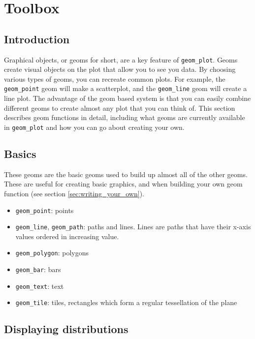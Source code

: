

\chapter{Toolbox}
\label{cha:toolbox}

\section{Introduction}\label{sec:introduction}

Graphical objects, or geoms for short, are a key feature of {\tt geom\_plot}.  Geoms create visual objects on the plot that allow you to see you data.  By choosing various types of geoms, you can recreate common plots.  For example, the {\tt geom\_point} geom will make a scatterplot, and the {\tt geom\_line} geom will create a line plot.  The advantage of the geom based system is that you can easily combine different geoms to create almost any plot that you can think of.  This section describes geom functions in detail, including what geoms are currently available in {\tt geom\_plot} and how you can go about creating your own.


\section{Basics}\label{sub:basics}

These geoms are the basic geoms used to build up almost all of the other geoms.  These are useful for creating basic graphics, and when building your own geom function (see section \ref{sec:writing_your_own}).

\begin{itemize}
  \item {\tt geom\_point}: points
  \item {\tt geom\_line}, {\tt geom\_path}: paths and lines.  Lines are paths that have their x-axis values ordered in increasing value.
  \item {\tt geom\_polygon}: polygons
  \item {\tt geom\_bar}: bars
  \item {\tt geom\_text}: text
  \item {\tt geom\_tile}: tiles, rectangles which form a regular tessellation of the plane
\end{itemize}

\section{Displaying distributions}\label{sec:distributions}

